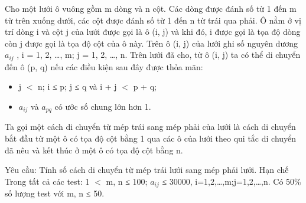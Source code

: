 Cho một lưới ô vuông gồm m dòng và n cột. Các dòng được đánh số từ 1 đến m từ trên xuống dưới, các cột được đánh số từ 1 đến n từ trái qua phải. Ô nằm ở vị trí dòng i và cột j của lưới được gọi là ô   (i, j) và khi đó, i được gọi là tọa độ dòng còn j được gọi là tọa độ cột của ô này. Trên ô (i, j) của lưới ghi số nguyên dương $a_{ij}$   , i = 1, 2, …, m; j = 1, 2, …, n. Trên lưới đã cho, từ ô (i, j) ta có thể   di chuyển đến ô (p, q) nếu các điều kiện sau đây được thỏa mãn:  
\begin{itemize}
	\item     j $<$ n; i ≤ p; j ≤ q và i + j $<$ p + q;   
	\item     $a_{ij}$    và $a_{pq}$    có ước số chung lớn hơn 1.   
\end{itemize}

   Ta gọi một cách di chuyển từ mép trái sang mép phải của lưới là cách di chuyển bắt đầu từ một ô có tọa độ cột bằng 1 qua các ô của lưới theo qui tắc di chuyển đã nêu và kết thúc ở một ô có tọa độ cột   bằng n.  

   Yêu cầu: Tính số cách di chuyển từ mép trái lưới sang mép phải lưới.
Hạn chế
Trong tất cả các test: 1 $<$ m, n ≤ 100; $a_{ij}$   ≤ 30000, i=1,2,…,m;j=1,2,…,n. Có 50\% số lượng test với m, n ≤ 50.